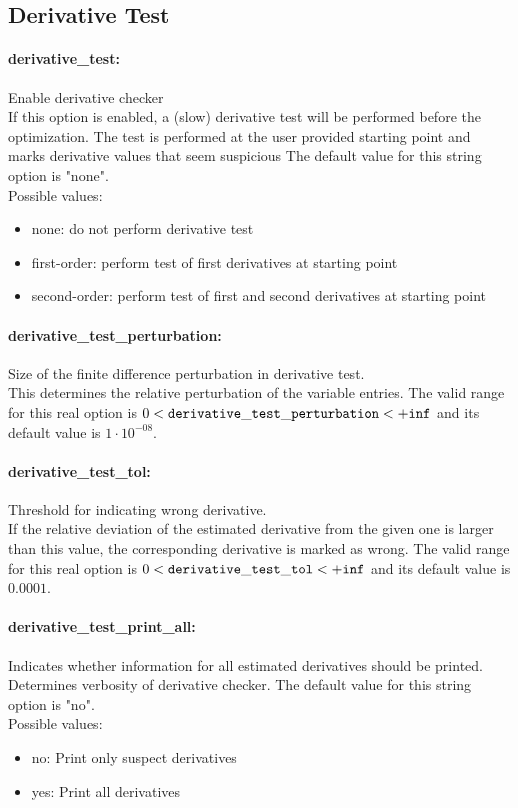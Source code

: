 \subsection{Derivative Test}

\paragraph{derivative\_test:}\label{sec:derivative_test} Enable derivative checker $\;$ \\
 If this option is enabled, a (slow) derivative
test will be performed before the optimization. 
The test is performed at the user provided
starting point and marks derivative values that
seem suspicious
The default value for this string option is "none".
\\ 
Possible values:
\begin{itemize}
   \item none: do not perform derivative test
   \item first-order: perform test of first derivatives at starting
point
   \item second-order: perform test of first and second derivatives at
starting point
\end{itemize}

\paragraph{derivative\_test\_perturbation:}\label{sec:derivative_test_perturbation} Size of the finite difference perturbation in derivative test. $\;$ \\
 This determines the relative perturbation of the
variable entries. The valid range for this real option is 
$0 <  {\tt derivative\_test\_perturbation } <  {\tt +inf}$
and its default value is $1 \cdot 10^{-08}$.


\paragraph{derivative\_test\_tol:}\label{sec:derivative_test_tol} Threshold for indicating wrong derivative. $\;$ \\
 If the relative deviation of the estimated
derivative from the given one is larger than this
value, the corresponding derivative is marked as
wrong. The valid range for this real option is 
$0 <  {\tt derivative\_test\_tol } <  {\tt +inf}$
and its default value is $0.0001$.


\paragraph{derivative\_test\_print\_all:}\label{sec:derivative_test_print_all} Indicates whether information for all estimated derivatives should be printed. $\;$ \\
 Determines verbosity of derivative checker.
The default value for this string option is "no".
\\ 
Possible values:
\begin{itemize}
   \item no: Print only suspect derivatives
   \item yes: Print all derivatives
\end{itemize}

